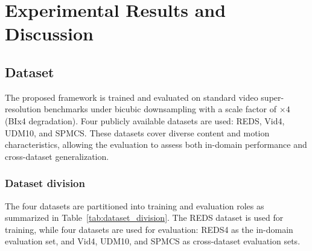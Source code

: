 \chapter{Experimental Results and Discussion}{}{}
\label{CH:EXP}%




\section{Dataset}
\label{sec:dataset}

The proposed framework is trained and evaluated on standard 
video super-resolution benchmarks under bicubic downsampling 
with a scale factor of $\times 4$ (BIx4 degradation). Four 
publicly available datasets are used: REDS, Vid4, UDM10, and 
SPMCS. These datasets cover diverse content and motion 
characteristics, allowing the evaluation to assess both 
in-domain performance and cross-dataset generalization.


\subsection{Dataset division}
\label{subsec:dataset_division}

The four datasets are partitioned into training and evaluation 
roles as summarized in Table~\ref{tab:dataset_division}. The 
REDS dataset is used for training, while four datasets are used 
for evaluation: REDS4 as the in-domain evaluation set, and Vid4, 
UDM10, and SPMCS as cross-dataset evaluation sets.

\begin{table}
\centering
\caption{Dataset division for training and evaluation.}
\label{tab:dataset_division}
\end{table}

